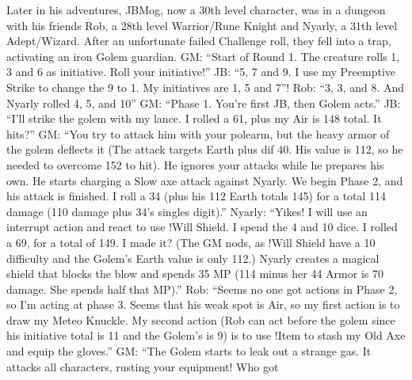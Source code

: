 \begin{multicols}{2}
Later in his adventures, JBMog, now a 30th level character,
was in a dungeon with his friends Rob, a 28th level
Warrior/Rune Knight and Nyarly, a 31th level
Adept/Wizard. After an unfortunate failed Challenge roll,
they fell into a trap, activating an iron Golem guardian.
GM: “Start of Round 1. The creature rolls 1, 3 and
6 as initiative. Roll your initiative!”
JB: “5, 7 and 9. I use my Preemptive Strike to
change the 9 to 1. My initiatives are 1, 5 and 7”!
Rob: “3, 3, and 8. And Nyarly rolled 4, 5, and 10”
GM: “Phase 1. You're first JB, then Golem acts.”
JB: “I'll strike the golem with my lance. I rolled a
61, plus my Air is 148 total. It hits?”
GM: “You try to attack him with your polearm,
but the heavy armor of the golem deflects it (The attack
targets Earth plus dif 40. His value is 112, so he needed
to overcome 152 to hit). He ignores your attacks while he
prepares his own. He starts charging a Slow axe attack
against Nyarly. We begin Phase 2, and his attack is
finished. I roll a 34 (plus his 112 Earth totals 145) for a
total 114 damage (110 damage plus 34's singles digit).”
Nyarly: “Yikes! I will use an interrupt action and
react to use !Will Shield. I spend the 4 and 10 dice. I
rolled a 69, for a total of 149. I made it? (The GM nods,
as !Will Shield have a 10 difficulty and the Golem's Earth
value is only 112.) Nyarly creates a magical shield that
blocks the blow and spends 35 MP (114 minus her 44
Armor is 70 damage. She spends half that MP).”
Rob: “Seems no one got actions in Phase 2, so I'm
acting at phase 3. Seems that his weak spot is Air, so my
first action is to draw my Meteo Knuckle. My second
action (Rob can act before the golem since his initiative
total is 11 and the Golem's is 9) is to use !Item to stash
my Old Axe and equip the gloves.”
GM: “The Golem starts to leak out a strange gas.
It attacks all characters, rusting your equipment! Who got


\end{multicols}
